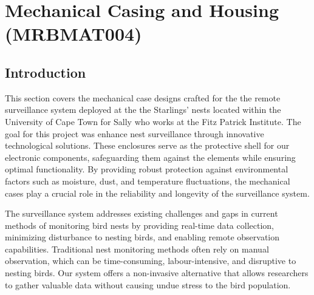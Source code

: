 \documentclass[class=report,11pt,crop=false]{standalone}
\begin{document}
\ifstandalone
\tableofcontents
\fi
\chapter{ Mechanical Casing and Housing (MRBMAT004)\label{ch:mechanical}}

\section{Introduction}
This section covers the mechanical case designs crafted for the the remote surveillance system deployed at the the Starlings’ nests located within the University of Cape Town for Sally who works at the Fitz Patrick Institute. The goal for this project was enhance nest surveillance through innovative technological solutions. These enclosures serve as the protective shell for our electronic components, safeguarding them against the elements while ensuring optimal functionality. By providing robust protection against environmental factors such as moisture, dust, and temperature fluctuations, the mechanical cases play a crucial role in the reliability and longevity of the surveillance system.
\newline

The surveillance system addresses existing challenges and gaps in current methods of monitoring bird nests by providing real-time data collection, minimizing disturbance to nesting birds, and enabling remote observation capabilities. Traditional nest monitoring methods often rely on manual observation, which can be time-consuming, labour-intensive, and disruptive to nesting birds. Our system offers a non-invasive alternative that allows researchers to gather valuable data without causing undue stress to the bird population.
\newline
\end{document}
